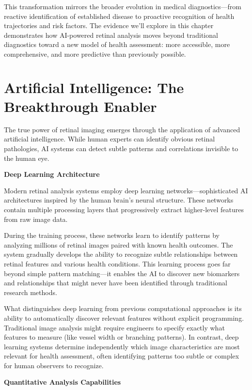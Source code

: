 \documentclass[
  Letterpaper,
]{scrbook}
\begin{document}
This transformation mirrors the broader evolution in medical
diagnostics---from reactive identification of established disease to
proactive recognition of health trajectories and risk factors. The
evidence we'll explore in this chapter demonstrates how AI-powered
retinal analysis moves beyond traditional diagnostics toward a new model
of health assessment: more accessible, more comprehensive, and more
predictive than previously possible.

\section{Artificial Intelligence: The Breakthrough
Enabler}\label{artificial-intelligence-the-breakthrough-enabler}

The true power of retinal imaging emerges through the application of
advanced artificial intelligence. While human experts can identify
obvious retinal pathologies, AI systems can detect subtle patterns and
correlations invisible to the human eye.

\textbf{Deep Learning Architecture}

Modern retinal analysis systems employ deep learning
networks---sophisticated AI architectures inspired by the human brain's
neural structure. These networks contain multiple processing layers that
progressively extract higher-level features from raw image data.

During the training process, these networks learn to identify patterns
by analyzing millions of retinal images paired with known health
outcomes. The system gradually develops the ability to recognize subtle
relationships between retinal features and various health conditions.
This learning process goes far beyond simple pattern matching---it
enables the AI to discover new biomarkers and relationships that might
never have been identified through traditional research methods.

What distinguishes deep learning from previous computational approaches
is its ability to automatically discover relevant features without
explicit programming. Traditional image analysis might require engineers
to specify exactly what features to measure (like vessel width or
branching patterns). In contrast, deep learning systems determine
independently which image characteristics are most relevant for health
assessment, often identifying patterns too subtle or complex for human
observers to recognize.

\textbf{Quantitative Analysis Capabilities}
\end{document}
